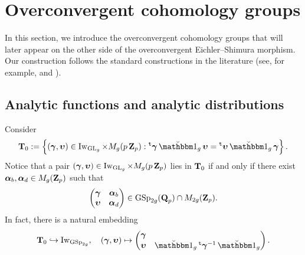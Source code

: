 \section{Overconvergent cohomology groups}\label{section:overconvergentcohomologies} 
In this section, we introduce the overconvergent cohomology groups that will later appear on the other side of the overconvergent Eichler--Shimura morphism. Our construction follows the standard constructions in the literature (see, for example, \cite{Hansen-PhD} and \cite{Johansson-Newton}). 

\subsection{Analytic functions and analytic distributions}\label{subsection:continuousfunctions}
Consider $$\T_0:=\left\{(\bfgamma, \bfupsilon)\in \Iw_{\GL_g}\times M_g(p\Z_p): \trans\bfgamma\oneanti_g\bfupsilon= \trans\bfupsilon\oneanti_g\bfgamma\right\}.$$ Notice that a pair $(\operatorname{\boldsymbol{\gamma}}, \operatorname{\boldsymbol{\upsilon}})\in \operatorname{Iw}_{\operatorname{GL}_g}\times M_g(p\operatorname{\mathbf{Z}}_p)$ lies in $\operatorname{\mathbf{T}}_0$ if and only if there exist $\operatorname{\boldsymbol{\alpha}}_b, \operatorname{\boldsymbol{\alpha}}_d\in M_g(\operatorname{\mathbf{Z}}_p)$ such that \[\begin{pmatrix}\operatorname{\boldsymbol{\gamma}} & \operatorname{\boldsymbol{\alpha}}_b\\ \operatorname{\boldsymbol{\upsilon}} & \operatorname{\boldsymbol{\alpha}}_d\end{pmatrix}\in \operatorname{GSp}_{2g}(\operatorname{\mathbf{Q}}_p)\cap M_{2g}(\operatorname{\mathbf{Z}}_p).\] 
In fact, there is a natural embedding
$$\T_0\hookrightarrow \Iw_{\GSp_{2g}}, \quad (\bfgamma, \bfupsilon)\mapsto \begin{pmatrix}\bfgamma & \\ \bfupsilon & \oneanti_g\trans\bfgamma^{-1}\oneanti_g\end{pmatrix}.$$
